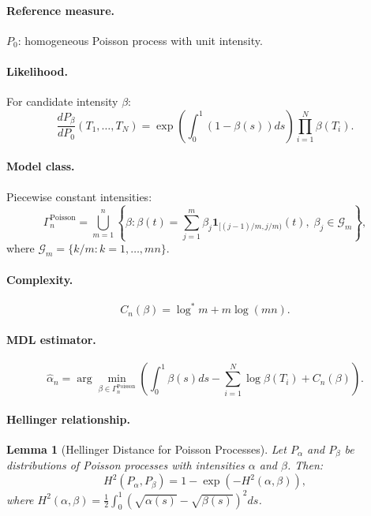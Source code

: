 \documentclass[preprint,review,12pt]{article}
\newtheorem{lemma}[theorem]{Lemma}
\begin{document}
\paragraph{Reference measure.} $P_0$: homogeneous Poisson process with unit 
intensity.

\paragraph{Likelihood.} For candidate intensity $\beta$:
\begin{equation}\label{eq:poisson_likelihood}
\frac{dP_\beta}{dP_0}(T_1, \ldots, T_N) = \exp\left( 
\int_0^1 (1 - \beta(s)) ds \right) \prod_{i=1}^N \beta(T_i).
\end{equation}

\paragraph{Model class.} Piecewise constant intensities:
\begin{equation}\label{eq:poisson_class}
\Gamma_n^{\text{Poisson}} = \bigcup_{m=1}^{n} \left\{ \beta : 
\beta(t) = \sum_{j=1}^m \beta_j \mathbf{1}_{[(j-1)/m, j/m)}(t), \; 
\beta_j \in \mathcal{G}_m \right\},
\end{equation}
where $\mathcal{G}_m = \{k/m : k = 1, \ldots, mn\}$.

\paragraph{Complexity.}
\begin{equation}\label{eq:poisson_complexity}
C_n(\beta) = \log^* m + m \log(mn).
\end{equation}

\paragraph{MDL estimator.}
\begin{equation}\label{eq:poisson_mdl}
\hat{\alpha}_n = \arg\min_{\beta \in \Gamma_n^{\text{Poisson}}} \left( 
\int_0^1 \beta(s) ds - \sum_{i=1}^N \log \beta(T_i) + C_n(\beta) \right).
\end{equation}

\paragraph{Hellinger relationship.}

\begin{lemma}[Hellinger Distance for Poisson Processes]\label{lem:poisson_hellinger}
Let $P_\alpha$ and $P_\beta$ be distributions of Poisson processes with 
intensities $\alpha$ and $\beta$. Then:
\begin{equation}\label{eq:poisson_hellinger}
	H^2(P_\alpha, P_\beta) = 1 - \exp\left( -H^2(\alpha, \beta) \right),
\end{equation}
where $H^2(\alpha, \beta) = \frac{1}{2} \int_0^1 (\sqrt{\alpha(s)} - \sqrt{\beta(s)})^2 ds$.
\end{lemma}
\end{document}
